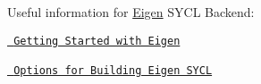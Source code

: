 Useful information for \mbox{\hyperlink{namespace_eigen}{Eigen}} S\+Y\+CL Backend\+:


\begin{DoxyItemize}
\item \href{https://developer.codeplay.com/computecppce/latest/getting-started-with-eigen}{\texttt{ Getting Started with Eigen}}
\item \href{https://developer.codeplay.com/computecppce/latest/options-for-building-eigen-sycl}{\texttt{ Options for Building Eigen S\+Y\+CL}} ~\newline
 
\end{DoxyItemize}